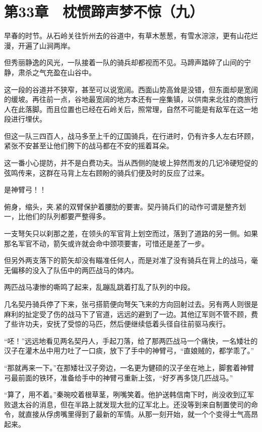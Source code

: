 \section{第33章　枕惯蹄声梦不惊（九）}

早春的时节。从石岭关往忻州去的谷道中，有草木葱葱，有雪水淙淙，更有山花烂漫，开遍了山涧两岸。

但秀丽静逸的风光，一队接着一队的骑兵却都视而不见。马蹄声踏碎了山间的宁静，肃杀之气充盈在山谷中。

这一段的谷道并不狭窄，甚至可以说宽阔。西面山势高耸是没错，但东面却是宽阔的缓坡。再往前一点，谷地最宽阔的地方本还有一座集镇，以供南来北往的商旅行人在此落脚。而且位置也已经在石岭关后，照常理，自然不可能是有敌军在这一地段进行埋伏。

但这一队三四百人，战马多至上千的辽国骑兵，在行进时，仍有许多人左右环顾，紧张不安甚至让他们胯下的战马都在不安的摇着耳朵。

这一番小心提防，并不是白费功夫。当从西侧的陡坡上猝然而发的几记冷硬短促的弦鸣传来，这群在马背上左右顾盼的骑兵们便及时的反应了过来。

是神臂弓！！

俯身，缩头，夹.紧的双臂保护着腰肋的要害。契丹骑兵们的动作可谓是整齐划一，比他们的队列都要严整得多。

一支弩矢只以刹那之差，在领头的军官背上划空而过，落到了道路的另一侧。如果那名军官不动，箭矢或许就会命中颈项要害，可惜还是差了一步。

但另外两支落下的箭矢却没有瞄准任何人，而是对准了没有骑兵在背上的战马，毫无偏移的没入了队伍中的两匹战马的体内。

两匹战马凄惨的嘶鸣了起来，乱蹦乱跳着打乱了队列的中段。

几名契丹骑兵停了下来，张弓搭箭便向弩矢飞来的方向回射过去。另有两人则很是麻利的扯定受了伤的战马下了官道，远远的避到了一边。其他辽军则不管不顾，费了些许功夫，安抚了受惊的马匹，然后便继续低着头径自往前驱马疾行。

“呸！”远远地看见两名契丹人，手起刀落，给了那两匹战马一个痛快，一名矮壮的汉子在灌木丛中用力吐了一口痰，放下了手中的神臂弓，“直娘贼的，都学乖了。”

“那就再来一下。”在那矮壮汉子旁边，一名更为健硕的汉子坐在地上，脚套着神臂弓最前面的铁环，准备给手中的神臂弓重新上弦，“好歹再多饶几匹战马。”

“算了，用不着。”秦琬咬着根草茎，咧嘴笑着。他护送韩信南下时，尚没收到辽军败退太谷的消息，但在半路上就发现大批的辽军北上。还没等到来自制置使司的命令，就直接从俘虏嘴里得到了最新的军情。从那一刻开始，就一个个变得士气高昂起来。

